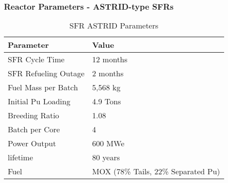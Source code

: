 \begin{frame}
    \frametitle{Reactor Parameters - ASTRID-type SFRs}
    
\begin{table}[h]
    \centering
    \begin{tabularx}{\textwidth}{bb}
        \hline
        Parameter & Value \\
        \hline
        SFR Cycle Time & 12 months \\ 
        SFR Refueling Outage & 2 months \\
        Fuel Mass per Batch & 5,568 kg \\
        Initial Pu Loading & 4.9 Tons \\
        Breeding Ratio & 1.08 \\
        Batch per Core & 4 \\
        Power Output & 600 MWe \\
        lifetime & 80 years \\
        Fuel & {\small \gls{MOX} (78\% Tails, 22\% Separated Pu)}\\
        \hline
    \end{tabularx}
    \caption {\gls{SFR} ASTRID Parameters \cite{varaine_pre-conceptual_2012}}
    \label{tab:sfr}
\end{table}
\end{frame}
